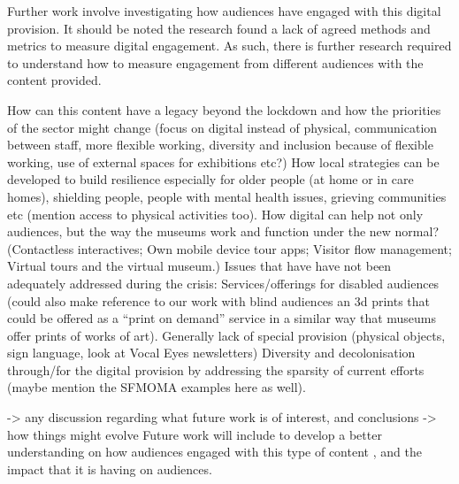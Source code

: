 \documentclass{egpubl}
\begin{document}
Further work involve investigating how audiences have engaged with this digital provision. It should be noted the research found a lack of agreed methods and metrics to measure digital engagement. As such, there is further research required to understand how to measure engagement from different audiences with the content provided. 

How can this content have a legacy beyond the lockdown and how the priorities of the sector might change (focus on digital instead of physical, communication between staff, more flexible working, diversity and inclusion because of flexible working, use of external spaces for exhibitions etc?)
How local strategies can be developed to build resilience especially for older people (at home or in care homes), shielding people, people with mental health issues, grieving communities etc (mention access to physical activities too). 
How digital can help not only audiences, but the way the museums work and function under the new normal? (Contactless interactives; Own mobile device tour apps; Visitor flow management; Virtual tours and the virtual museum.)
Issues that have have not been adequately addressed during the crisis:
Services/offerings for disabled audiences (could also make reference to our work with blind audiences an 3d prints that could be offered as a “print on demand” service in a similar way that museums offer prints of works of art). Generally lack of special provision (physical objects, sign language, look at Vocal Eyes newsletters)
Diversity and decolonisation through/for the digital provision by addressing the sparsity of current efforts (maybe mention the SFMOMA examples here as well).

-> any discussion regarding what future work is of interest, and conclusions
->  how things might evolve
Future work will include to develop a better  understanding on how audiences engaged with this type of content  , and the impact that it is having on audiences. 







  
        


\end{document}
